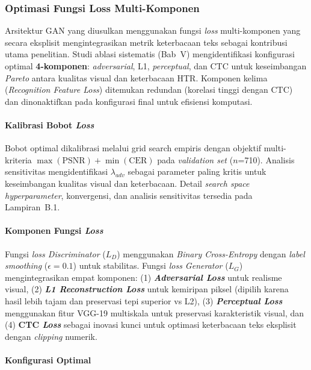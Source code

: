 \subsubsection{Optimasi Fungsi Loss Multi-Komponen} %

Arsitektur GAN yang diusulkan menggunakan fungsi \textit{loss} multi-komponen yang secara eksplisit mengintegrasikan metrik keterbacaan teks sebagai kontribusi utama penelitian. Studi ablasi sistematis (Bab~V) mengidentifikasi konfigurasi optimal \textbf{4-komponen}: \textit{adversarial}, L1, \textit{perceptual}, dan CTC untuk keseimbangan \textit{Pareto} antara kualitas visual dan keterbacaan HTR. Komponen kelima (\textit{Recognition Feature Loss}) ditemukan redundan (korelasi tinggi dengan CTC) dan dinonaktifkan pada konfigurasi final untuk efisiensi komputasi.

\paragraph{Kalibrasi Bobot \textit{Loss}}

Bobot optimal dikalibrasi melalui grid search empiris dengan objektif multi-kriteria $\max(\text{PSNR}) + \min(\text{CER})$ pada \textit{validation set} ($n$=710). Analisis sensitivitas mengidentifikasi $\lambda_{adv}$ sebagai parameter paling kritis untuk keseimbangan kualitas visual dan keterbacaan. Detail \textit{search space hyperparameter}, konvergensi, dan analisis sensitivitas tersedia pada Lampiran~B.1.

\paragraph{Komponen Fungsi \textit{Loss}}

Fungsi \textit{loss Discriminator} ($L_D$) menggunakan \textit{Binary Cross-Entropy} dengan \textit{label smoothing} ($\epsilon=0.1$) untuk stabilitas. Fungsi \textit{loss Generator} ($L_G$) mengintegrasikan empat komponen: (1) \textbf{\textit{Adversarial Loss}} untuk realisme visual, (2) \textbf{\textit{L1 Reconstruction Loss}} untuk kemiripan piksel (dipilih karena hasil lebih tajam dan preservasi tepi superior vs L2), (3) \textbf{\textit{Perceptual Loss}} menggunakan fitur VGG-19 multiskala untuk preservasi karakteristik visual, dan (4) \textbf{CTC \textit{Loss}} sebagai inovasi kunci untuk optimasi keterbacaan teks eksplisit dengan \textit{clipping} numerik.

\paragraph{Konfigurasi Optimal}

